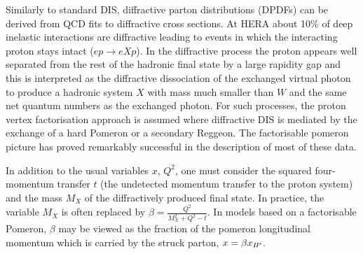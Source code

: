 Similarly to standard DIS, diffractive parton distributions (DPDFs) 
can be derived from QCD fits to diffractive cross sections.
At HERA about 10\% of deep inelastic interactions are diffractive leading to
events in which the interacting proton stays intact ($ep\to eXp$). 
In the diffractive process the proton appears well separated from the 
rest of the hadronic final state by a large rapidity gap  
and this is interpreted as the diffractive dissociation 
of the exchanged virtual photon to produce a hadronic system $X$ with mass much 
smaller than $W$ and the same net quantum numbers as the exchanged photon.
For such processes, the proton vertex factorisation approach
is assumed where diffractive DIS is mediated by the exchange of a hard Pomeron 
or a
secondary Reggeon. 
The factorisable pomeron picture has proved remarkably successful in the description of most of these data.
%

In addition to the usual variables $x$, $Q^2$, one must consider the squared four-momentum transfer $t$
(the undetected momentum transfer to the proton system) and
the mass $M_X$ of the diffractively produced final state. 
In practice, the variable $M_X$ 
is often replaced by $\beta=\frac{Q^2}{M_X^2+Q^2-t}$.
%
In models based on a factorisable Pomeron, $\beta$ may be viewed as the fraction of the
pomeron longitudinal momentum which is carried by the struck parton, $x=\beta x_{{I\!P}}$.

